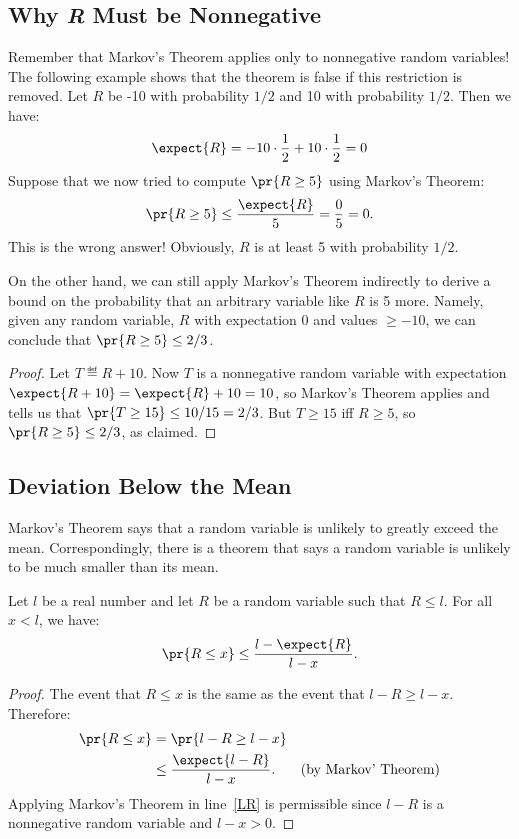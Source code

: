 \begin{editingnotes}

\subsection{Why \emph{R} Must be Nonnegative}

Remember that Markov's Theorem applies only to nonnegative random
variables!  The following example shows that the theorem is false if this
restriction is removed.  Let $R$ be -10 with probability $1/2$ and 10 with
probability $1/2$.  Then we have:
\[
\expect{R} = -10 \cdot \frac{1}{2} + 10 \cdot \frac{1}{2} = 0
\]
Suppose that we now tried to compute $\pr{R \geq 5}$ using Markov's
Theorem:
\begin{displaymath}
  \pr{R \geq 5} \leq \frac{\expect{R}}{5} = \frac{0}{5} = 0.
\end{displaymath}
This is the wrong answer!  Obviously, $R$ is at least 5 with
probability $1/2$.

On the other hand, we can still apply Markov's Theorem indirectly to
derive a bound on the probability that an arbitrary variable like $R$ is 5
more.  Namely, given any random variable, $R$ with expectation 0 and
values $\geq -10$, we can conclude that $\pr{R \geq 5} \le 2/3$.
\begin{proof}
Let $T \eqdef R+10$.  Now $T$ is a nonnegative random variable with
expectation $\expect{R + 10} = \expect{R}+10= 10$, so Markov's Theorem
applies and tells us that $\pr{T \geq 15} \le 10/15 = 2/3$.  But $T \geq
15$ iff $R \geq 5$, so $\pr{R \geq 5} \leq 2/3$, as claimed.
\end{proof}

\subsection{Deviation Below the Mean}

Markov's Theorem says that a random variable is unlikely to greatly exceed
the mean.  Correspondingly, there is a theorem that says a random variable
is unlikely to be much smaller than its mean.

\begin{theorem}
\label{th:below}
Let $l$ be a real number and let $R$ be a random variable such that $R
\leq l$.  For all $x < l$, we have:
\[
\pr{R \leq x} \leq \frac{l - \expect{R}}{l - x}.
\]
\end{theorem}

\begin{proof}
The event that $R \leq x$ is the same as the event that $l - R \geq l -
x$.  Therefore:
\begin{align}
\pr{R \leq x} &  = \pr{l - R \geq l - x}\notag\\
 & \leq \frac{\expect{l - R}}{l - x}. & \text{(by Markov' Theorem)}\label{LR}
\end{align}
Applying Markov's Theorem in line~\eqref{LR} is permissible
since $l - R$ is a nonnegative random variable and $l - x > 0$.
\end{proof}


\end{editingnotes}
